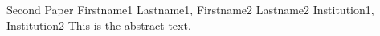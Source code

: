 \begin{conf-abstract}
{Second Paper}
{Firstname1 Lastname1, Firstname2 Lastname2}
{Institution1, Institution2}
This is the abstract text.
\end{conf-abstract}

